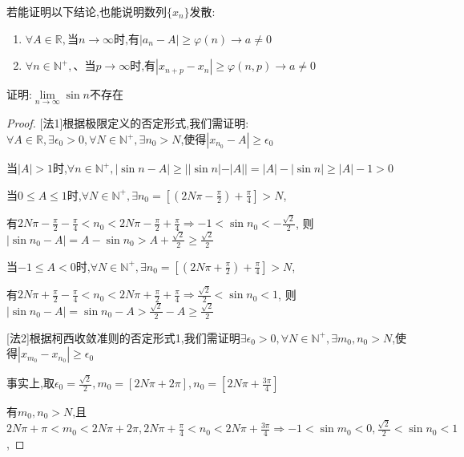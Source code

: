 \begin{note}若能证明以下结论,也能说明数列$\{x_n\}$发散:
    \begin{enumerate}
        \item $\forall A\in \mathbb{R},\mbox{当} n\to \infty \mbox{时,有}|a_n-A| \ge \varphi (n) \to a \ne 0$
        \item $\forall n\in \mathbb{N}^+,、\mbox{当}p\to \infty \mbox{时,有} |x_{n+p}-x_n| \ge \varphi(n,p) \to a \ne 0$
    \end{enumerate}
\end{note}

\begin{example}
    证明:$\lim \limits_{n \to \infty} \sin n$不存在
\end{example}

\begin{proof}

    [法1]根据极限定义的否定形式,我们需证明:$ \forall A \in \mathbb{R}, \exists \epsilon_0 > 0,\forall N\in \mathbb{N}^+,\exists n_0 > N$,使得$|x_{n_0}-A|\ge \epsilon_0$

    当$|A|>1$时,$\forall n\in \mathbb{N}^+,|\sin n - A| \ge ||\sin n|-|A||=|A|-|\sin n|\ge |A|-1>0$

    当$0\le A \le 1$时,$\forall N\in \mathbb{N}^+,\exists n_0=[(2N\pi - \frac{\pi}{2})+\frac{\pi}{4}]>N$,

    有$2N\pi - \frac{\pi}{2}-\frac{\pi}{4} < n_0 < 2N\pi -\frac{\pi}{2}+\frac{\pi}{4} \Longrightarrow -1 < \sin n_0 < -\frac{\sqrt{2}}{2}$,
    则$|\sin n_0 -A|=A-\sin n_0 > A+\frac{\sqrt{2}}{2}\ge \frac{\sqrt{2}}{2}$

    当$-1\le A<0$时,$\forall N\in \mathbb{N}^+,\exists n_0=[(2N\pi + \frac{\pi}{2})+\frac{\pi}{4}]>N$,

    有$2N\pi + \frac{\pi}{2}-\frac{\pi}{4} < n_0 < 2N\pi +\frac{\pi}{2}+\frac{\pi}{4} \Longrightarrow \frac{\sqrt{2}}{2} < \sin n_0 < 1 $,
    则$|\sin n_0 -A|=\sin n_0 - A > \frac{\sqrt{2}}{2} - A \ge \frac{\sqrt{2}}{2}$

    [法2]根据柯西收敛准则的否定形式1,我们需证明$\exists \epsilon_0 > 0,\forall N\in \mathbb{N}^+,\exists m_0,n_0 > N$,使得$|x_{m_0}-x_{n_0}|\ge \epsilon_0 $

    事实上,取$\epsilon_0=\frac{\sqrt{2}}{2},m_0=[2N\pi + 2\pi] ,n_0=[2N\pi + \frac{3\pi}{4}]$

    有$m_0,n_0>N$,且$2N\pi + \pi <m_0< 2N\pi + 2\pi,2N\pi +\frac{\pi}{4}<n_0<2N\pi + \frac{3\pi}{4}\Longrightarrow -1<\sin m_0<0,\frac{\sqrt{2}}{2}<\sin n_0<1$,


\end{proof}
